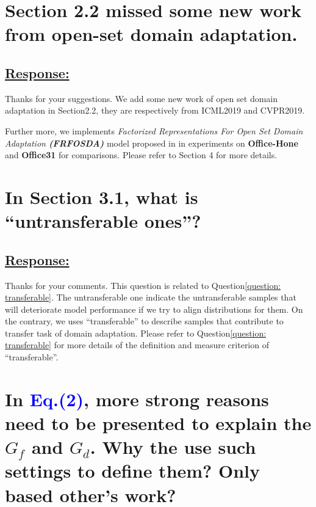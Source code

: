 \section{
    Section 2.2 missed some new work from open-set domain adaptation. 
}
\subsection*{\underline{\textbf{Response:}}}
Thanks for your suggestions.
We add some new work \cite{PDA-fac,PDA-sep} of open set domain adaptation in Section2.2, they are respectively from ICML2019 and CVPR2019.

Further more, we implements \textit{Factorized Representations For Open Set Domain Adaptation \textbf{(FRFOSDA)}} model proposed in \cite{PDA-fac} in experiments on \textbf{Office-Hone} and \textbf{Office31} for comparisons.
Please refer to Section 4 for more details.

\section{
    In Section 3.1, what is ``untransferable ones''? 
}

\subsection*{\underline{\textbf{Response:}}}

Thanks for your comments.
This question is related to Question\ref{question: transferable}.
The untransferable one indicate the untransferable samples that will deteriorate model performance if we try to align distributions for them.
On the contrary, we uses ``transferable'' to describe samples that contribute to transfer task of domain adaptation. 
Please refer to Question\ref{question: transferable} for more details of the definition and measure criterion of ``transferable''. 

\section{
    In \textcolor{blue}{Eq.(2)}, more strong reasons need to be presented to explain the $G_f$ and $G_d$. 
    Why the use such settings to define them? Only based other's work? 
}
